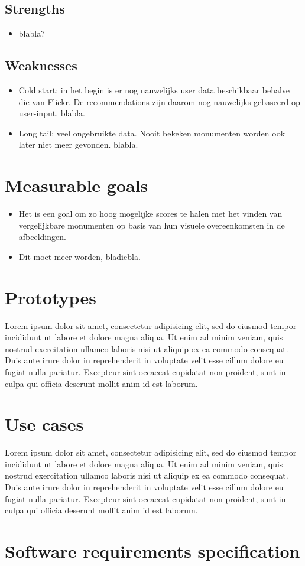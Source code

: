 \documentclass{article}
\begin{document}
\subsection{Strengths}
\begin{itemize}
\item blabla?
\end{itemize}
\subsection{Weaknesses}
\begin{itemize}
\item Cold start: in het begin is er nog nauwelijks user data beschikbaar behalve die van Flickr. De recommendations zijn daarom nog nauwelijks gebaseerd op user-input. blabla.
\item Long tail: veel ongebruikte data. Nooit bekeken monumenten worden ook later niet meer gevonden. blabla.
\end{itemize}
\section{Measurable goals}
\begin{itemize}
\item Het is een goal om zo hoog mogelijke scores te halen met het vinden van vergelijkbare monumenten op basis van hun visuele overeenkomsten in de afbeeldingen.
\item Dit moet meer worden, bladiebla.
\end{itemize}
\section{Prototypes}
Lorem ipsum dolor sit amet, consectetur adipisicing elit, sed do eiusmod tempor incididunt ut labore et dolore magna aliqua. Ut enim ad minim veniam, quis nostrud exercitation ullamco laboris nisi ut aliquip ex ea commodo consequat. Duis aute irure dolor in reprehenderit in voluptate velit esse cillum dolore eu fugiat nulla pariatur. Excepteur sint occaecat cupidatat non proident, sunt in culpa qui officia deserunt mollit anim id est laborum.
\section{Use cases}
Lorem ipsum dolor sit amet, consectetur adipisicing elit, sed do eiusmod tempor incididunt ut labore et dolore magna aliqua. Ut enim ad minim veniam, quis nostrud exercitation ullamco laboris nisi ut aliquip ex ea commodo consequat. Duis aute irure dolor in reprehenderit in voluptate velit esse cillum dolore eu fugiat nulla pariatur. Excepteur sint occaecat cupidatat non proident, sunt in culpa qui officia deserunt mollit anim id est laborum.
\section{Software requirements specification}
\end{document}
